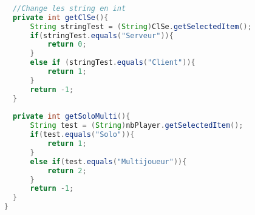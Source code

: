 \begin{lstlisting}[language=Java]
  
  	  //Change les string en int 
  	  private int getClSe(){
  		  String stringTest = (String)ClSe.getSelectedItem();
  		  if(stringTest.equals("Serveur")){
  			  return 0;
  		  }
  		  else if (stringTest.equals("Client")){
  			  return 1;
  		  }
  		  return -1;
  	  }
  	  
  	  private int getSoloMulti(){
  		  String test = (String)nbPlayer.getSelectedItem();
  		  if(test.equals("Solo")){
  			  return 1;
  		  }
  		  else if(test.equals("Multijoueur")){
  			  return 2;
  		  }
  		  return -1;
  	  }
	}
	
	  
	\end{lstlisting}